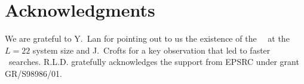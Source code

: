 
\section*{Acknowledgments}

We are grateful to Y.~Lan for pointing out to us the existence of
the  ~\eqv\ at the $L=22$ system size and J.~Crofts for a key
observation  that led to faster \rpo\ searches.
R.L.D. gratefully acknowledges the support from EPSRC under grant GR/S98986/01.
